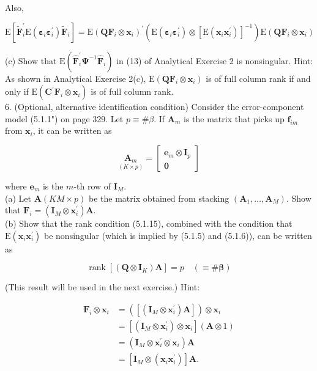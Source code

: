 \documentclass[10pt]{article}
\begin{document}
Also,

$$
\mathrm{E}\left[\widetilde{\mathbf{F}}_{i}^{\prime} \mathrm{E}\left(\boldsymbol{\varepsilon}_{i} \boldsymbol{\varepsilon}_{i}^{\prime}\right) \widetilde{\mathbf{F}}_{i}\right]=\mathrm{E}\left(\mathbf{Q} \mathbf{F}_{i} \otimes \mathbf{x}_{i}\right)^{\prime}\left(\mathrm{E}\left(\boldsymbol{\varepsilon}_{i} \boldsymbol{\varepsilon}_{i}^{\prime}\right) \otimes\left[\mathrm{E}\left(\mathbf{x}_{i} \mathbf{x}_{i}^{\prime}\right)\right]^{-1}\right) \mathrm{E}\left(\mathbf{Q} \mathbf{F}_{i} \otimes \mathbf{x}_{i}\right)
$$

(c) Show that $\mathrm{E}\left(\widehat{\mathbf{F}}_{i}^{\prime} \boldsymbol{\Psi}^{-1} \widehat{\mathbf{F}}_{i}\right)$ in (13) of Analytical Exercise 2 is nonsingular. Hint: As shown in Analytical Exercise 2(c), $\mathrm{E}\left(\mathbf{Q} \mathbf{F}_{i} \otimes \mathbf{x}_{i}\right)$ is of full column rank if and only if $\mathrm{E}\left(\mathbf{C}^{\prime} \mathbf{F}_{i} \otimes \mathbf{x}_{i}\right)$ is of full column rank.\\
6. (Optional, alternative identification condition) Consider the error-component model (5.1.1") on page 329. Let $p \equiv \# \beta$. If $\mathbf{A}_{m}$ is the matrix that picks up $\mathbf{f}_{i m}$ from $\mathbf{x}_{i}$, it can be written as

$$
\underset{(K \times p)}{\mathbf{A}_{m}}=\left[\begin{array}{c}
\mathbf{e}_{m} \otimes \mathbf{I}_{p} \\
\mathbf{0}
\end{array}\right]
$$

where $\mathbf{e}_{m}$ is the $m$-th row of $\mathbf{I}_{M}$.\\
(a) Let $\mathbf{A}(K M \times p)$ be the matrix obtained from stacking $\left(\mathbf{A}_{1}, \ldots, \mathbf{A}_{M}\right)$. Show that $\mathbf{F}_{i}=\left(\mathbf{I}_{M} \otimes \mathbf{x}_{i}^{\prime}\right) \mathbf{A}$.\\
(b) Show that the rank condition (5.1.15), combined with the condition that $\mathrm{E}\left(\mathbf{x}_{i} \mathbf{x}_{i}^{\prime}\right)$ be nonsingular (which is implied by (5.1.5) and (5.1.6)), can be written as

$$
\operatorname{rank}\left[\left(\mathbf{Q} \otimes \mathbf{I}_{K}\right) \mathbf{A}\right]=p \quad(\equiv \# \boldsymbol{\beta})
$$

(This result will be used in the next exercise.) Hint:

$$
\begin{aligned}
\mathbf{F}_{i} \otimes \mathbf{x}_{i} & =\left(\left[\left(\mathbf{I}_{M} \otimes \mathbf{x}_{i}^{\prime}\right) \mathbf{A}\right]\right) \otimes \mathbf{x}_{i} \\
& =\left[\left(\mathbf{I}_{M} \otimes \mathbf{x}_{i}^{\prime}\right) \otimes \mathbf{x}_{i}\right](\mathbf{A} \otimes 1) \\
& =\left(\mathbf{I}_{M} \otimes \mathbf{x}_{i}^{\prime} \otimes \mathbf{x}_{i}\right) \mathbf{A} \\
& =\left[\mathbf{I}_{M} \otimes\left(\mathbf{x}_{i} \mathbf{x}_{i}^{\prime}\right)\right] \mathbf{A} .
\end{aligned}
$$
\end{document}
